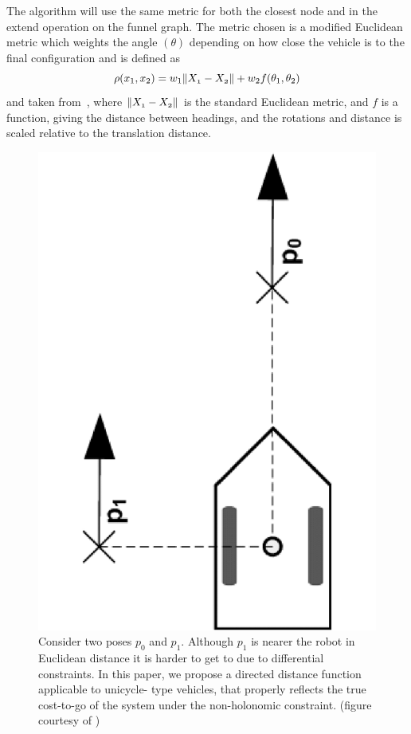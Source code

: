 The \rrtfunnel{} algorithm will use the same metric for both the closest node
and in the extend operation on the funnel graph. The metric chosen is a modified
Euclidean metric which weights the angle \((\theta)\) depending on how close the
vehicle is to the final configuration and is defined as
\[
  \rho(x_{1},x_{2}) = w_{1}\lVert\mathnormal{X_{1}} - \mathnormal{X_{2}}\rVert +
  w_{2}f(\theta_1,\theta_2)
\]
and taken from~\cite{kuffnerEffectiveSamplingDistance2004}, where
\(\lVert\mathnormal{X_{1}} - \mathnormal{X_{2}}\rVert\) is the standard Euclidean
metric, and \(f\) is a function, giving the distance between headings, and the
rotations and distance is scaled relative to the translation distance.

\begin{figure}
  \centering
  \includegraphics[scale=.2,angle=-90]{figures/rrtfunnel/non-holonomic-vehicle-euclidean-weakness}
  \caption{Consider two poses \(p_0\) and \(p_1\). Although \(p_1\) is nearer
    the robot in Euclidean distance it is harder to get to due to differential
    constraints. In this paper, we propose a directed distance function
    applicable to unicycle- type vehicles, that properly reflects the true
    cost-to-go of the system under the non-holonomic constraint. (figure
    courtesy of \cite{parkFeedbackMotionPlanning2015})}
  \label{fig:non-holonomic-vehicle-euclidean-weakness}
\end{figure}


